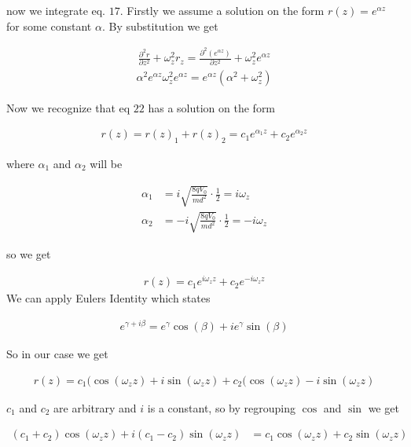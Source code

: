 \documentclass[english,notitlepage]{revtex4-1}  %
\begin{document}
now we integrate eq. $17$. Firstly we assume a solution on the form $r(z) = e^{\alpha z}$ for some constant $\alpha$. By substitution we get

\begin{align}
    \frac{\partial^2 r}{\partial z^2} + \omega_z^2 r_z = \frac{\partial^2 (e^{\alpha z})}{\partial z^2} + \omega_z^2 e^{\alpha z}
\end{align}
\begin{align}
    \alpha^2 e^{\alpha z} \omega_z^2 e^{\alpha z} = e^{\alpha z} ( \alpha^2 + \omega_z^2) 
\end{align}

Now we recognize that eq $22$ has a solution on the form

\begin{align}
    r(z) = r(z)_1 + r(z)_2 = c_1 e^{\alpha_1 z} + c_2 e^{\alpha_2 z}
\end{align}

where $\alpha_1$ and $\alpha_2$ will be 

\begin{align}
    \alpha_1 &= i \sqrt{\frac{8 q V_0}{md^2}} \cdot \frac{1}{2} = i \omega_z
    \\
    \alpha_2 &= -i \sqrt{\frac{8 q V_0}{md^2}} \cdot \frac{1}{2} = -i \omega_z
\end{align}

so we get 

\begin{align}
    r(z) = c_1 e^{i \omega_z z} + c_2 e^{-i \omega_z z}
\end{align}
We can apply Eulers Identity which states

\begin{align}
    e^{\gamma + i \beta} = e^{\gamma} \cos(\beta) + ie^{\gamma} \sin(\beta)
\end{align}

So in our case we get 

\begin{align}
    r(z) = c_1 ( \cos(\omega_z z) + i \sin(\omega_z z) + c_2 ( \cos(\omega_z z) - i \sin(\omega_z z)
\end{align}

$c_1$ and $c_2$ are arbitrary and $i$ is a constant, so by regrouping $\cos$ and $\sin$ we get 

\begin{align}
    (c_1 + c_2) \cos(\omega_z z) + i (c_1 - c_2) \sin(\omega_z z) &= c_1 \cos(\omega_z z) + c_2 \sin(\omega_z z)
\end{align}
\end{document}
